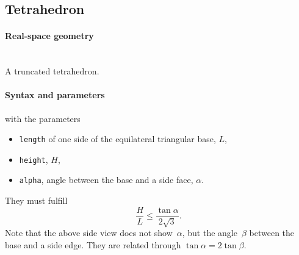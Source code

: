 \clearpage
\subsection{Tetrahedron} \label{sec:Tetrahedron}
 
\paragraph{Real-space geometry}\strut\\
A truncated tetrahedron.

\begin{figure}[h]
\hfill
{}
\hfill
{}
\hfill
\end{figure}

\FloatBarrier

\paragraph{Syntax and parameters}
\begin{quote}
\end{quote}
with the parameters
\begin{itemize}
\item \texttt{length} of one side of the equilateral triangular base, $L$,
\item \texttt{height}, $H$,
\item \texttt{alpha}, angle between the base and a side face, $\alpha$.
\end{itemize}
They must fulfill
\begin{displaymath}
\dfrac{H}{L}\le \dfrac{\tan{\alpha}}{2\sqrt{3}}.
\end{displaymath}
Note that the above side view does not show~$\alpha$,
but the angle~$\beta$ between the base and a side edge.
They are related through $\tan \alpha = 2 \tan \beta$. 

